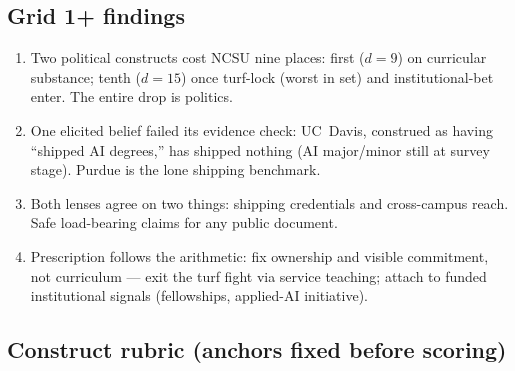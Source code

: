 \documentclass[11pt]{article}
\begin{document}
\subsection*{Grid 1+ findings}
\begin{enumerate}[itemsep=2pt]
\item Two political constructs cost NCSU nine places: first ($d=9$) on curricular substance; tenth ($d=15$) once turf-lock (worst in set) and institutional-bet enter. The entire drop is politics.
\item One elicited belief failed its evidence check: UC~Davis, construed as having ``shipped AI degrees,'' has shipped nothing (AI major/minor still at survey stage). Purdue is the lone shipping benchmark.
\item Both lenses agree on two things: shipping credentials and cross-campus reach. Safe load-bearing claims for any public document.
\item Prescription follows the arithmetic: fix ownership and visible commitment, not curriculum --- exit the turf fight via service teaching; attach to funded institutional signals (fellowships, applied-AI initiative).
\end{enumerate}

\subsection*{Construct rubric (anchors fixed before scoring)}
\end{document}
